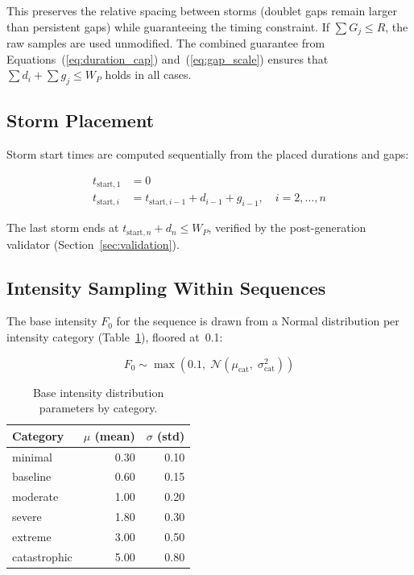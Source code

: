 \documentclass[11pt,a4paper]{article}
\begin{document}
\noindent This preserves the relative spacing between storms (doublet gaps remain larger
than persistent gaps) while guaranteeing the timing constraint. If $\sum G_j \leq R$,
the raw samples are used unmodified. The combined guarantee from
Equations~(\ref{eq:duration_cap}) and~(\ref{eq:gap_scale}) ensures that
$\sum d_i + \sum g_j \leq W_P$ holds in all cases.

\subsection{Storm Placement}
\label{sec:placement}

Storm start times are computed sequentially from the placed durations and gaps:

\begin{align}
  t_{\text{start},1} &= 0 \label{eq:start_first} \\
  t_{\text{start},i} &= t_{\text{start},i-1} + d_{i-1} + g_{i-1},
    \quad i = 2, \ldots, n \label{eq:start_i}
\end{align}

\noindent The last storm ends at $t_{\text{start},n} + d_n \leq W_P$, verified by the
post-generation validator (Section~\ref{sec:validation}).

\subsection{Intensity Sampling Within Sequences}
\label{sec:intensity}

The base intensity $F_0$ for the sequence is drawn from a Normal distribution
per intensity category (Table~\ref{tab:intensity_params}), floored at~0.1:

\begin{equation}
  F_0 \sim \max\!\left(0.1,\; \mathcal{N}(\mu_{\text{cat}},\; \sigma_{\text{cat}}^2)\right)
  \label{eq:base_intensity}
\end{equation}

\begin{table}[H]
  \centering
  \caption{Base intensity distribution parameters by category.}
  \label{tab:intensity_params}
  \begin{tabular}{lrr}
    \toprule
    \textbf{Category} & $\mu$ (mean) & $\sigma$ (std) \\
    \midrule
    minimal      & 0.30 & 0.10 \\
    baseline     & 0.60 & 0.15 \\
    moderate     & 1.00 & 0.20 \\
    severe       & 1.80 & 0.30 \\
    extreme      & 3.00 & 0.50 \\
    catastrophic & 5.00 & 0.80 \\
    \bottomrule
  \end{tabular}
\end{table}
\end{document}
